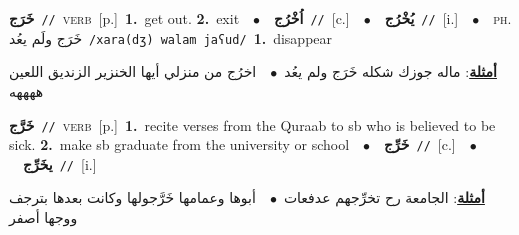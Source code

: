 \documentclass[10pt,a4paper,twoside]{article} %
\begin{document}
\begin{multicols}{2}
{\setlength\topsep{0pt}\textbf{\foreignlanguage{arabic}{خَرَج}}\ {\color{gray}\texttt{//}\color{black}}\ \textsc{verb}\ [p.]\ \textbf{1.}~get out.  \textbf{2.}~exit\ \ $\bullet$\ \ \setlength\topsep{0pt}\textbf{\foreignlanguage{arabic}{اُخْرُج}}\ {\color{gray}\texttt{//}\color{black}}\ [c.]\ \ $\bullet$\ \ \setlength\topsep{0pt}\textbf{\foreignlanguage{arabic}{يُخْرُج}}\ {\color{gray}\texttt{//}\color{black}}\ [i.]\ \ $\bullet$\ \ \textsc{ph.} \color{gray} \foreignlanguage{arabic}{خَرَج ولَم يعُد}\color{black}\ {\color{gray}\texttt{/{\sffamily xara(dʒ) walam jaʕud}/}\color{black}}\ \textbf{1.}~disappear\  \begin{flushright}\color{gray}\foreignlanguage{arabic}{\textbf{\underline{\foreignlanguage{arabic}{أمثلة}}}: ماله جوزك شكله خَرَج ولم يعُد\ $\bullet$\ \  اخرُج من منزلي أيها الخنزير الزنديق اللعين ههههه}\end{flushright}\color{black}} \vspace{2mm}

{\setlength\topsep{0pt}\textbf{\foreignlanguage{arabic}{خَرَّج}}\ {\color{gray}\texttt{//}\color{black}}\ \textsc{verb}\ [p.]\ \textbf{1.}~recite verses from the Quraab to sb who is believed to be sick.  \textbf{2.}~make sb graduate from the university or school\ \ $\bullet$\ \ \setlength\topsep{0pt}\textbf{\foreignlanguage{arabic}{خَرِّج}}\ {\color{gray}\texttt{//}\color{black}}\ [c.]\ \ $\bullet$\ \ \setlength\topsep{0pt}\textbf{\foreignlanguage{arabic}{يخَرِّج}}\ {\color{gray}\texttt{//}\color{black}}\ [i.]\  \begin{flushright}\color{gray}\foreignlanguage{arabic}{\textbf{\underline{\foreignlanguage{arabic}{أمثلة}}}: الجامعة رح تخرِّجهم عدفعات\ $\bullet$\ \  أبوها وعمامها خَرَّجولها وكانت بعدها بترجف ووجها أصفر}\end{flushright}\color{black}} \vspace{2mm}


\end{multicols}
\end{document}
